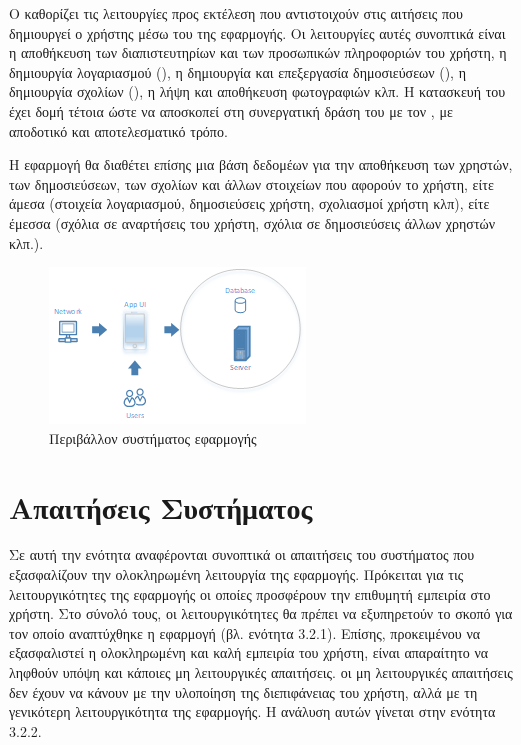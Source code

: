 Ο  καθορίζει τις λειτουργίες προς εκτέλεση που αντιστοιχούν στις αιτήσεις που δημιουργεί ο χρήστης μέσω του  της εφαρμογής. Οι λειτουργίες αυτές συνοπτικά είναι η αποθήκευση των διαπιστευτηρίων και των προσωπικών πληροφοριών του χρήστη, η δημιουργία λογαριασμού (), η δημιουργία και επεξεργασία δημοσιεύσεων (), η δημιουργία σχολίων (), η λήψη και αποθήκευση φωτογραφιών κλπ. Η κατασκευή του  έχει δομή τέτοια ώστε να αποσκοπεί στη συνεργατική δράση του με τον , με αποδοτικό και αποτελεσματικό τρόπο.

Η εφαρμογή θα διαθέτει επίσης μια βάση δεδομέων για την αποθήκευση των χρηστών, των δημοσιεύσεων, των σχολίων και άλλων στοιχείων που αφορούν το χρήστη, είτε άμεσα (στοιχεία λογαριασμού, δημοσιεύσεις χρήστη, σχολιασμοί χρήστη κλπ), είτε έμεσσα (σχόλια σε αναρτήσεις του χρήστη, σχόλια σε δημοσιεύσεις άλλων χρηστών κλπ.).  


\begin{figure}[h]
    \centering
    \includegraphics[scale=1]{figures/app-ecosystem.png}
    \caption{Περιβάλλον συστήματος εφαρμογής}
    \label{appecosystem}
\end{figure}

\section{Απαιτήσεις Συστήματος}
Σε αυτή την ενότητα αναφέρονται συνοπτικά οι απαιτήσεις του συστήματος που εξασφαλίζουν την ολοκληρωμένη λειτουργία της εφαρμογής. Πρόκειται για τις λειτουργικότητες της εφαρμογής οι οποίες προσφέρουν την επιθυμητή εμπειρία στο χρήστη. Στο σύνολό τους, οι λειτουργικότητες θα πρέπει να εξυπηρετούν το σκοπό για τον οποίο αναπτύχθηκε η εφαρμογή (βλ. ενότητα 3.2.1). Επίσης, προκειμένου να εξασφαλιστεί η ολοκληρωμένη και καλή εμπειρία του χρήστη, είναι απαραίτητο να ληφθούν υπόψη και κάποιες μη λειτουργικές απαιτήσεις. οι μη λειτουργικές απαιτήσεις δεν έχουν να κάνουν με την υλοποίηση της διεπιφάνειας του χρήστη, αλλά με τη γενικότερη λειτουργικότητα της εφαρμογής. Η ανάλυση αυτών γίνεται στην ενότητα 3.2.2.

